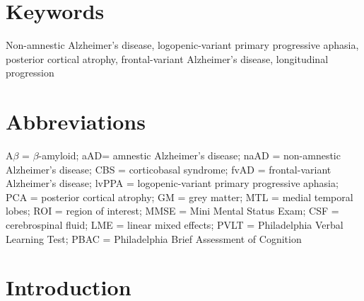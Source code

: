 \documentclass[]{article}
\begin{document}
\section*{Keywords}\label{keywords}

Non-amnestic Alzheimer's disease, logopenic-variant primary progressive
aphasia, posterior cortical atrophy, frontal-variant Alzheimer's
disease, longitudinal progression

\section*{Abbreviations}\label{abbreviations}

A\(\beta\) = \(\beta\)-amyloid; aAD= amnestic Alzheimer's disease; naAD
= non-amnestic Alzheimer's disease; CBS = corticobasal syndrome; fvAD =
frontal-variant Alzheimer's disease; lvPPA = logopenic-variant primary
progressive aphasia; PCA = posterior cortical atrophy; GM = grey matter;
MTL = medial temporal lobes; ROI = region of interest; MMSE = Mini
Mental Status Exam; CSF = cerebrospinal fluid; LME = linear mixed
effects; PVLT = Philadelphia Verbal Learning Test; PBAC = Philadelphia
Brief Assessment of Cognition

\newpage

\section*{Introduction}\label{introduction}
\end{document}
